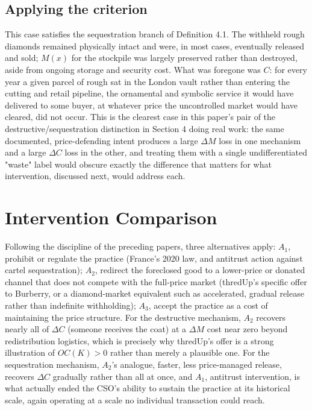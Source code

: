 \documentclass[11pt]{article}
\begin{document}
\subsection{Applying the criterion}

This case satisfies the sequestration branch of Definition 4.1. The withheld rough diamonds remained physically intact and were, in most cases, eventually released and sold; $M(x)$ for the stockpile was largely preserved rather than destroyed, aside from ongoing storage and security cost. What was foregone was $C$: for every year a given parcel of rough sat in the London vault rather than entering the cutting and retail pipeline, the ornamental and symbolic service it would have delivered to some buyer, at whatever price the uncontrolled market would have cleared, did not occur. This is the clearest case in this paper's pair of the destructive/sequestration distinction in Section 4 doing real work: the same documented, price-defending intent produces a large $\Delta M$ loss in one mechanism and a large $\Delta C$ loss in the other, and treating them with a single undifferentiated "waste" label would obscure exactly the difference that matters for what intervention, discussed next, would address each.

\section{Intervention Comparison}

Following the discipline of the preceding papers, three alternatives apply: $A_1$, prohibit or regulate the practice (France's 2020 law, and antitrust action against cartel sequestration); $A_2$, redirect the foreclosed good to a lower-price or donated channel that does not compete with the full-price market (thredUp's specific offer to Burberry, or a diamond-market equivalent such as accelerated, gradual release rather than indefinite withholding); $A_3$, accept the practice as a cost of maintaining the price structure. For the destructive mechanism, $A_2$ recovers nearly all of $\Delta C$ (someone receives the coat) at a $\Delta M$ cost near zero beyond redistribution logistics, which is precisely why thredUp's offer is a strong illustration of $OC(K) > 0$ rather than merely a plausible one. For the sequestration mechanism, $A_2$'s analogue, faster, less price-managed release, recovers $\Delta C$ gradually rather than all at once, and $A_1$, antitrust intervention, is what actually ended the CSO's ability to sustain the practice at its historical scale, again operating at a scale no individual transaction could reach.
\end{document}
